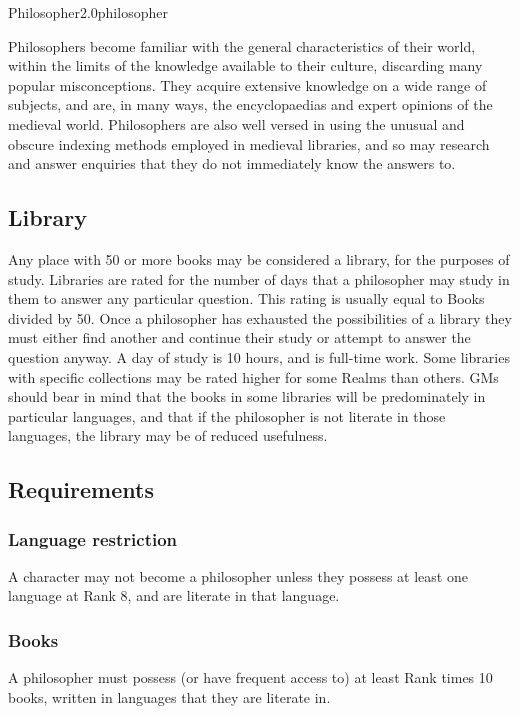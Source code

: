 \begin{skill}{Philosopher}{2.0}{philosopher}

Philosophers become familiar with the general characteristics of their
world, within the limits of the knowledge available to their culture,
discarding many popular misconceptions.  They acquire extensive
knowledge on a wide range of subjects, and are, in many ways, the
encyclopaedias and expert opinions of the medieval world.
Philosophers are also well versed in using the unusual and obscure
indexing methods employed in medieval libraries, and so may research
and answer enquiries that they do not immediately know the answers to.

\subsection{Library}

Any place with 50 or more books may be considered a library, for the
purposes of study.  Libraries are rated for the number of days that a
philosopher may study in them to answer any particular question.  This
rating is usually equal to Books divided by 50. Once a philosopher has
exhausted the possibilities of a library they must either find another
and continue their study or attempt to answer the question anyway.  A
day of study is 10 hours, and is full-time work. Some libraries with
specific collections may be rated higher for some Realms than others.
GMs should bear in mind that the books in some libraries will be
predominately in particular languages, and that if the philosopher is
not literate in those languages, the library may be of reduced
usefulness.

\subsection{Requirements}

\subsubsection{Language restriction}

A character may not become a philosopher unless they possess at least
one language at Rank 8, and are literate in that language.

\subsubsection{Books}

A philosopher must possess (or have frequent access to) at least Rank
times 10 books, written in languages that they are literate in.


\end{skill}
